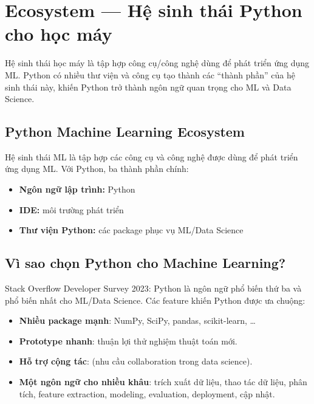 \section{Ecosystem --- Hệ sinh thái Python cho học máy}

\begin{dongco}[title={Vì sao nói về “hệ sinh thái”?}]
Hệ sinh thái học máy là tập hợp công cụ/công nghệ dùng để phát triển ứng dụng ML.
Python có nhiều thư viện và công cụ tạo thành các “thành phần” của hệ sinh thái này, khiến Python trở thành ngôn ngữ quan trọng cho ML và Data Science.
\end{dongco}

\subsection{Python Machine Learning Ecosystem}

\begin{dinhnghia}[title={Machine learning ecosystem}]
Hệ sinh thái ML là tập hợp các công cụ và công nghệ được dùng để phát triển ứng dụng ML.
Với Python, ba thành phần chính:
\begin{itemize}
  \item \textbf{Ngôn ngữ lập trình:} Python
  \item \textbf{IDE:} môi trường phát triển
  \item \textbf{Thư viện Python:} các package phục vụ ML/Data Science
\end{itemize}
\end{dinhnghia}

\subsection{Vì sao chọn Python cho Machine Learning?}

\begin{ynghia}[title={Lý do chọn Python}]
Stack Overflow Developer Survey 2023: Python là ngôn ngữ phổ biến thứ ba và phổ biến nhất cho ML/Data Science.
Các feature khiến Python được ưa chuộng:
\end{ynghia}

\begin{phuongphap}[title={Các điểm nổi bật}]
\begin{itemize}
  \item \textbf{Nhiều package mạnh}: NumPy, SciPy, pandas, scikit-learn, \ldots
  \item \textbf{Prototype nhanh}: thuận lợi thử nghiệm thuật toán mới.
  \item \textbf{Hỗ trợ cộng tác}: (nhu cầu collaboration trong data science).
  \item \textbf{Một ngôn ngữ cho nhiều khâu}: trích xuất dữ liệu, thao tác dữ liệu, phân tích, feature extraction, modeling, evaluation, deployment, cập nhật.
\end{itemize}
\end{phuongphap}

